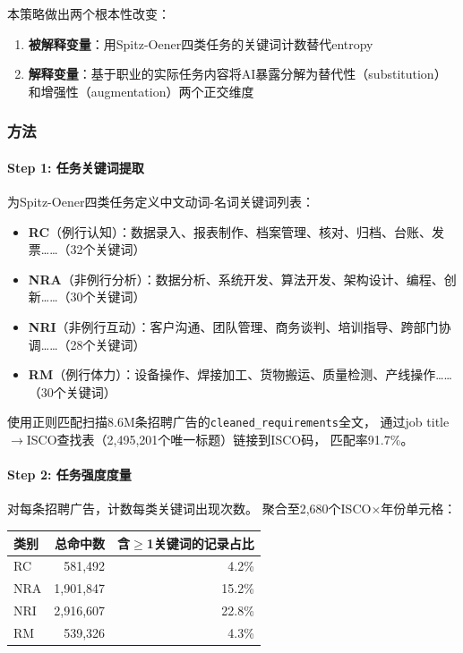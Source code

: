 \documentclass[12pt,a4paper]{ctexart}
\begin{document}
本策略做出两个根本性改变：
\begin{enumerate}
\item \textbf{被解释变量}：用Spitz-Oener四类任务的关键词计数替代entropy
\item \textbf{解释变量}：基于职业的实际任务内容将AI暴露分解为替代性（substitution）
      和增强性（augmentation）两个正交维度
\end{enumerate}

\subsubsection{方法}

\paragraph{Step 1: 任务关键词提取}

为Spitz-Oener四类任务定义中文动词-名词关键词列表：

\begin{itemize}
\item \textbf{RC}（例行认知）：数据录入、报表制作、档案管理、核对、归档、台账、发票……（32个关键词）
\item \textbf{NRA}（非例行分析）：数据分析、系统开发、算法开发、架构设计、编程、创新……（30个关键词）
\item \textbf{NRI}（非例行互动）：客户沟通、团队管理、商务谈判、培训指导、跨部门协调……（28个关键词）
\item \textbf{RM}（例行体力）：设备操作、焊接加工、货物搬运、质量检测、产线操作……（30个关键词）
\end{itemize}

使用正则匹配扫描8.6M条招聘广告的\texttt{cleaned\_requirements}全文，
通过job title$\to$ISCO查找表（2,495,201个唯一标题）链接到ISCO码，
匹配率91.7\%。

\paragraph{Step 2: 任务强度度量}

对每条招聘广告，计数每类关键词出现次数。
聚合至2,680个ISCO$\times$年份单元格：

\begin{center}
\small
\begin{tabular}{lrr}
\toprule
类别 & 总命中数 & 含$\geq$1关键词的记录占比 \\
\midrule
RC & 581,492 & 4.2\% \\
NRA & 1,901,847 & 15.2\% \\
NRI & 2,916,607 & 22.8\% \\
RM & 539,326 & 4.3\% \\
\bottomrule
\end{tabular}
\end{center}
\end{document}
